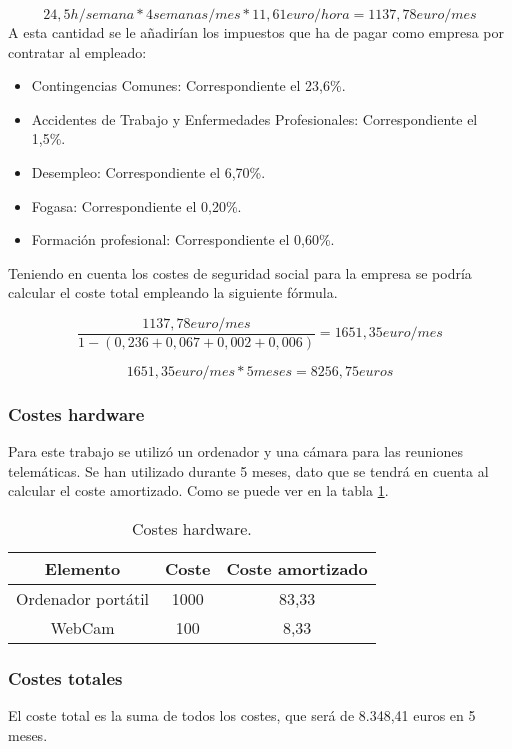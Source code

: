 \begin{equation}
	24,5h/semana * 4semanas/mes * 11,61euro/hora = 1137,78 euro/mes
\end{equation}
A esta cantidad se le añadirían los impuestos que ha de pagar como empresa por contratar al empleado:
\begin{itemize}
	\item Contingencias Comunes: Correspondiente el 23,6\%.
	 \item  Accidentes de Trabajo y Enfermedades Profesionales: Correspondiente el 1,5\%.
	 \item Desempleo: Correspondiente el 6,70\%.
	 \item Fogasa: Correspondiente el 0,20\%.
	 \item Formación profesional: Correspondiente el 0,60\%.
\end{itemize}

Teniendo en cuenta los costes de seguridad social para la empresa se podría calcular el coste total empleando la siguiente fórmula.

\begin{equation}
\dfrac{	1137,78 euro/mes}{1-(0,236 + 0,067 + 0,002 + 0,006 )} = 1651,35 euro/mes
\end{equation}

\begin{equation}
 1651,35 euro/mes * 5 meses = 8256,75 euros
\end{equation}

\subsubsection{Costes hardware}
Para este trabajo se utilizó un ordenador  y una cámara para las reuniones telemáticas. Se han utilizado durante 5 meses, dato que se tendrá en cuenta al calcular el coste amortizado. Como se puede ver en la tabla \ref{costes:hardware}.
\begin{table}
	\centering
\begin{tabular}{|c|c|c|}
	\hline
	\textbf{Elemento} & \textbf{Coste} &\textbf{ Coste amortizado} \\
	\hline
	Ordenador portátil  & 1000 & 83,33 \\
	\hline
	WebCam & 100 & 8,33 \\
	\hline
\end{tabular}
\caption{Costes hardware.}
\label{costes:hardware}
\end{table}
\subsubsection{Costes totales}
El coste total es la suma de todos los costes, que será de 8.348,41 euros en 5 meses.
